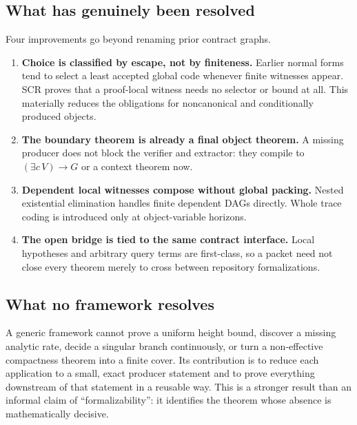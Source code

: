 \subsection{What has genuinely been resolved}

Four improvements go beyond renaming prior contract graphs.

\begin{enumerate}[label=(\arabic*)]
\item \textbf{Choice is classified by escape, not by finiteness.}  Earlier
normal forms tend to select a least accepted global code whenever finite
witnesses appear.  SCR proves that a proof-local witness needs no selector or
bound at all.  This materially reduces the obligations for noncanonical and
conditionally produced objects.
\item \textbf{The boundary theorem is already a final object theorem.}  A
missing producer does not block the verifier and extractor: they compile to
\((\exists c\,V)\to G\) or a context theorem now.
\item \textbf{Dependent local witnesses compose without global packing.}
Nested existential elimination handles finite dependent DAGs directly.  Whole
trace coding is introduced only at object-variable horizons.
\item \textbf{The open bridge is tied to the same contract interface.}  Local
hypotheses and arbitrary query terms are first-class, so a packet need not
close every theorem merely to cross between repository formalizations.
\end{enumerate}

\subsection{What no framework resolves}

A generic framework cannot prove a uniform height bound, discover a missing
analytic rate, decide a singular branch continuously, or turn a non-effective
compactness theorem into a finite cover.  Its contribution is to reduce each
application to a small, exact producer statement and to prove everything
downstream of that statement in a reusable way.  This is a stronger result
than an informal claim of ``formalizability'': it identifies the theorem whose
absence is mathematically decisive.
